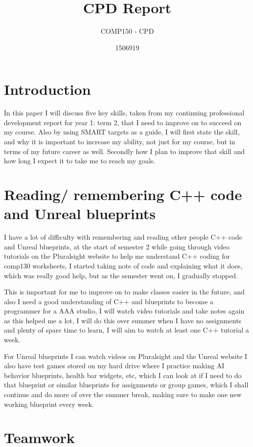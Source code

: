 \documentclass{scrartcl}
\title{CPD Report}
\subtitle{COMP150 - CPD}
\author{1506919}
\begin{document}
\maketitle

\section*{Introduction}

In this paper I will discuss five key skills, taken from my continuing professional development report for year 1: term 2, that I need to improve on to succeed on my course. Also by using SMART targets as a guide, I will first state the skill, and why it is important to increase my ability, not just for my course, but in terms of my future career as well. Secondly how I plan to improve that skill and how long I expect it to take me to reach my goals.

\section*{Reading/ remembering C++ code and Unreal blueprints}

I have a lot of difficulty with remembering and reading other people C++ code and Unreal blueprints, at the start of semester 2 while going through video tutorials on the Pluralsight website to help me understand C++ coding for comp130 worksheets, I started taking note of code and explaining what it does, which was really good help, but as the semester went on, I gradually stopped. 

This is important for me to improve on to make classes easier in the future, and also I need a good understanding of C++ and blueprints to become a programmer for a AAA studio, I will watch video tutorials and take notes again as this helped me a lot, I will do this over summer when I have no assignments and plenty of spare time to learn, I will aim to watch at least one C++ tutorial a week.

For Unreal blueprints I can watch videos on Pluralsight and the Unreal website I also have test games stored on my hard drive where I practice making AI behavior blueprints, health bar widgets, etc, which I can look at if I need to do that blueprint or similar blueprints for assignments or group games, which I shall continue and do more of over the summer break, making sure to make one new working blueprint every week.

\section*{Teamwork}
\end{document}
